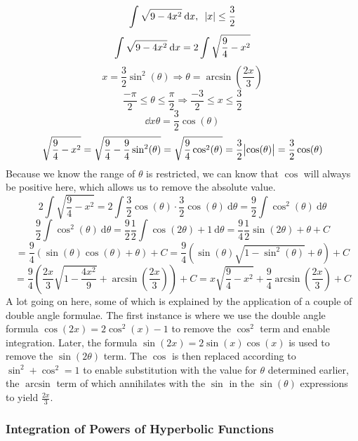 \documentclass[12pt]{report}
\begin{document}
\begin{flushleft}
\begin{center}
\[\int\sqrt{9 - 4x^2}\:\mathrm{d}x, \:\:\: \abs{x} \leq \frac{3}{2}\]
\[\int\sqrt{9 - 4x^2}\:\mathrm{d}x = 2\int\sqrt{\frac{9}{4} - x^2}\]
\[x = \frac{3}{2}\sin^2(\theta) \Rightarrow \theta = 
\arcsin\left(\frac{2x}{3}\right)\] 
\[\frac{-\pi}{2} \leq \theta \leq \frac{\pi}{2} \Rightarrow \frac{-3}{2} \leq
x \leq \frac{3}{2}\]
\[\dd{x}{\theta} = \frac{3}{2}\cos(\theta)\]
\[\sqrt{\frac{9}{4} - x^2} = \sqrt{\frac{9}{4} - \frac{9}{4}\sin^2(\theta)} =
\sqrt{\frac{9}{4}\cos^2(\theta)} = \frac{3}{2}\abs{\cos(\theta)} 
= \frac{3}{2}\cos(\theta)\]
Because we know the range of \(\theta\) is restricted, we can know that
\(\cos\) will always be positive here, which allows us to remove the absolute
value.
\[2\int\sqrt{\frac{9}{4} - x^2} = 2\int\frac{3}{2}\cos(\theta)\cdot\frac{3}{2}
\cos(\theta)\:\mathrm{d}\theta 
= \frac{9}{2}\int\cos^2(\theta)\:\mathrm{d}\theta\]
\[\frac{9}{2}\int\cos^2(\theta)\:\mathrm{d}\theta = \frac{9}{2}\frac{1}{2}
\int\cos(2\theta) + 1\:\mathrm{d}\theta = \frac{9}{4}\frac{1}{2}\sin(2\theta)
+ \theta + C\]
\[= \frac{9}{4}\left(\sin(\theta)\cos(\theta) + \theta\right) + C = \frac{9}{4}
\left(\sin(\theta)\sqrt{1 - \sin^2(\theta)} + \theta\right) + C\]
\[= \frac{9}{4}\left(\frac{2x}{3}\sqrt{1 - \frac{4x^2}{9}} + 
\arcsin\left(\frac{2x}{3}\right)\right) + C = x\sqrt{\frac{9}{4} - x^2} 
+ \frac{9}{4}\arcsin\left(\frac{2x}{3}\right) + C\]
A lot going on here, some of which is explained by the application of a couple
of double angle formulae. The first instance is where we use the double angle
formula \(\cos(2x) = 2\cos^2(x) - 1\) to remove the \(\cos^2\) term and enable
integration. Later, the formula \(\sin(2x) = 2\sin(x)\cos(x)\) is used to
remove the \(\sin(2\theta)\) term. The \(\cos\) is then replaced according to
\(\sin^2 + \cos^2 = 1\) to enable substitution with the value for \(\theta\)
determined earlier, the \(\arcsin\) term of which annihilates with the 
\(\sin\) in the \(\sin(\theta)\) expressions to yield \(\frac{2x}{3}\).
\end{center}

\subsubsection*{Integration of Powers of Hyperbolic Functions}


\end{flushleft}
\end{document}
